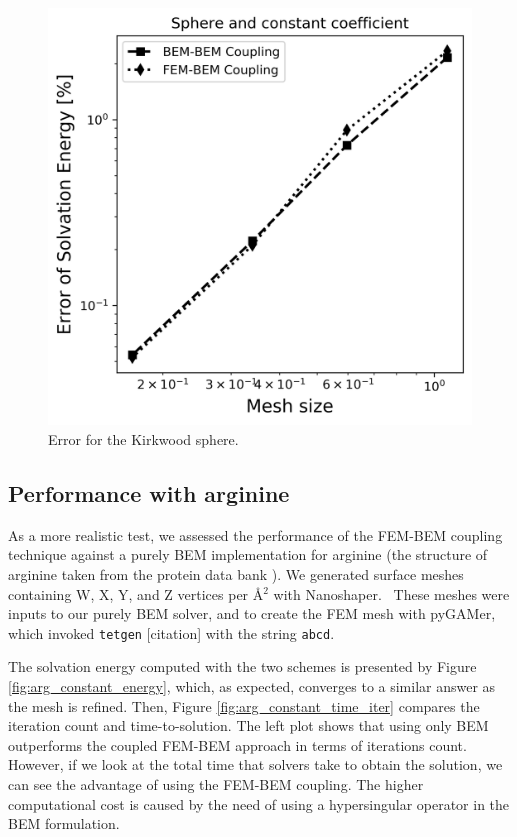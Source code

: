 \begin{figure}
  \centering
  \includegraphics[width=0.6\linewidth]{Sphere_const_coeff_error.png}
  \caption{Error for the Kirkwood sphere.}
  \label{fig:error_sphere}
\end{figure}

\subsection*{\sffamily \large Performance with arginine}

As a more realistic test, we assessed the performance of the FEM-BEM coupling technique against a purely BEM implementation for arginine (the structure of arginine taken from the protein data bank \cite{bank}). 
We generated surface meshes containing W, X, Y, and Z vertices per \AA$^2$ with Nanoshaper.~\cite{decherchi2013general}
These meshes were inputs to our purely BEM solver, and to create the FEM mesh with pyGAMer,~\cite{lee2020open} which invoked \texttt{tetgen} [citation] with the string \texttt{abcd}.

The solvation energy computed with the two schemes is presented by Figure \ref{fig:arg_constant_energy}, which, as expected, converges to a similar answer as the mesh is refined.
Then, Figure \ref{fig:arg_constant_time_iter} compares the iteration count and time-to-solution. The left plot shows that using only BEM outperforms the coupled FEM-BEM approach in terms of iterations count. However, if we look at the total time that solvers take to obtain the solution, we can see the advantage of using the FEM-BEM coupling. The higher computational cost is caused by the need of using a hypersingular operator in the BEM formulation.


